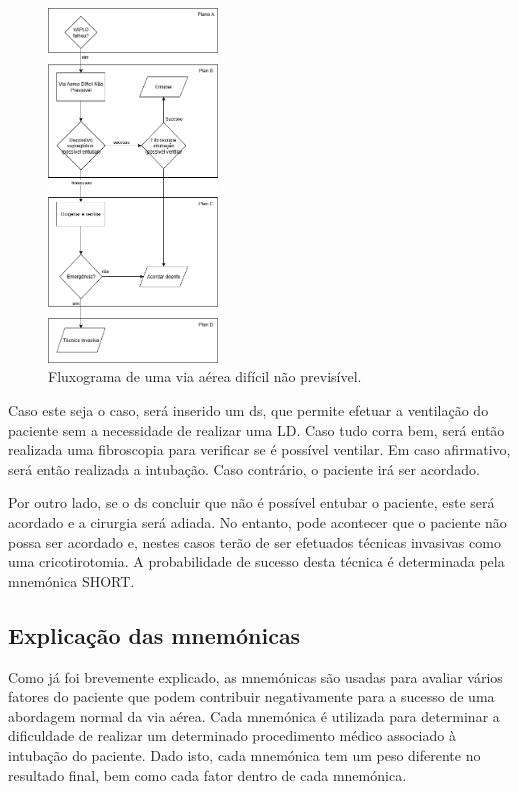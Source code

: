 \documentclass[a4paper,12pt,twoside]{article}
\begin{document}
    \begin{figure}[H]
        \centering
        \includegraphics[width=0.4\textwidth]{./resources/pdf/VADNP.drawio.png}
        \caption{Fluxograma de uma via aérea difícil não previsível.}
        \label{fig:vadnp}
    \end{figure}

    Caso este seja o caso, será inserido um \gls{ds}, que permite efetuar a ventilação do paciente sem a necessidade de realizar uma \gls{LD}. Caso tudo corra bem, será então realizada uma \gls{fibroscopia} para verificar se é possível ventilar. Em caso afirmativo, será então realizada a intubação. Caso contrário, o paciente irá ser acordado.

    Por outro lado, se o \gls{ds} concluir que não é possível entubar o paciente, este será acordado e a cirurgia será adiada. No entanto, pode acontecer que o paciente não possa ser acordado e, nestes casos terão de ser efetuados técnicas invasivas como uma \gls{cricotirotomia}. A probabilidade de sucesso desta técnica é determinada pela mnemónica \gls{SHORT}.\@

    \subsection{Explicação das mnemónicas}
    \label{sec:mnemonicas}
    Como já foi brevemente explicado, as mnemónicas são usadas para avaliar vários fatores do paciente que podem contribuir negativamente para a sucesso de uma abordagem normal da via aérea. Cada mnemónica é utilizada para determinar a dificuldade de realizar um determinado procedimento médico associado à intubação do paciente. Dado isto, cada mnemónica tem um peso diferente no resultado final, bem como cada fator dentro de cada mnemónica.
\end{document}
